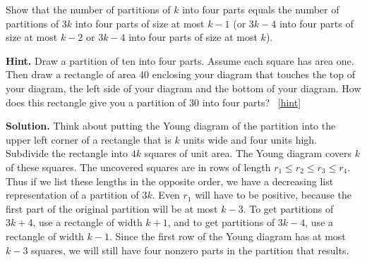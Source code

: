 \documentclass{book}
\begin{document}
\setcounter{project}{307}
\addtocounter{project}{-1}
\begin{activity}[]\label{rectanglecomplement}
\hypertarget{p-1529}{}%
Show that the number of partitions of \(k\) into four parts equals the number of partitions of \(3k\) into four parts of size at most \(k-1\) (or \(3k-4\) into four parts of size at most \(k-2\) or \(3k-4\) into four parts of size at most \(k\)).%
\par\smallskip%
\noindent\textbf{Hint.}\hypertarget{hint-193}{}\quad%
\hypertarget{p-1530}{}%
Draw a partition of ten into four parts. Assume each square has area one. Then draw a rectangle of area 40 enclosing your diagram that touches the top of your diagram, the left side of your diagram and the bottom of your diagram. How does this rectangle give you a partition of 30 into four parts?%
~\hfill{\tiny\hyperlink{a-307}{[hint]}\hypertarget{q-307}{}}\par\smallskip%
\noindent\textbf{Solution.}\hypertarget{solution-195}{}\quad%
\hypertarget{p-1531}{}%
Think about putting the Young diagram of the partition into the upper left corner of a rectangle that is \(k\) units wide and four units high. Subdivide the rectangle into \(4k\) squares of unit area. The Young diagram covers \(k\) of these squares. The uncovered squares are in rows of length \(r_1\le r_2\le r_3\le r_4\). Thus if we list these lengths in the opposite order, we have a decreasing list representation of a partition of \(3k\). Even \(r_1\) will have to be positive, because the first part of the original partition will be at most \(k-3\). To get partitions of \(3k+4\), use a rectangle of width \(k+1\), and to get partitions of \(3k-4\), use a rectangle of width \(k-1\). Since the first row of the Young diagram has at most \(k-3\) squares, we will still have four nonzero parts in the partition that results.%
\end{activity}

\clearpage
\end{document}
